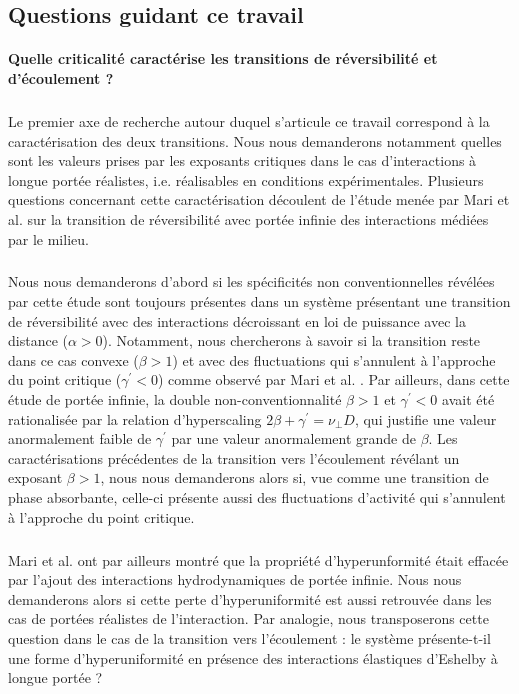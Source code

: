 \subsection{Questions guidant ce travail}

\paragraph{Quelle criticalité caractérise les transitions de réversibilité et d'écoulement ?}

\subparagraph{}Le premier axe de recherche autour duquel s'articule ce travail correspond à la caractérisation des deux transitions. Nous nous demanderons notamment quelles sont les valeurs prises par les exposants critiques dans le cas d'interactions à longue portée réalistes, i.e. réalisables en conditions expérimentales. Plusieurs questions concernant cette caractérisation découlent de l'étude menée par Mari et al. \cite{mari_absorbing_2022} sur la transition de réversibilité avec portée infinie des interactions médiées par le milieu. 

\subparagraph{}Nous nous demanderons d'abord si les spécificités non conventionnelles révélées par cette étude sont toujours présentes dans un système présentant une transition de réversibilité avec des interactions décroissant en loi de puissance avec la distance ($\alpha > 0$). Notamment, nous chercherons à savoir si la transition reste dans ce cas convexe ($\beta >1$) et avec des fluctuations qui s'annulent à l'approche du point critique ($\gamma^\prime < 0$) comme observé par Mari et al. \cite{mari_absorbing_2022}. Par ailleurs, dans cette étude de portée infinie, la double non-conventionnalité $\beta >1$ et $\gamma^\prime < 0$ avait été rationalisée par la relation d'hyperscaling $2\beta + \gamma^\prime = \nu_\perp D$, qui justifie une valeur anormalement faible de $\gamma^\prime$ par une valeur anormalement grande de $\beta$. Les caractérisations précédentes de la transition vers l'écoulement révélant un exposant $\beta >1$, nous nous demanderons alors si, vue comme une transition de phase absorbante, celle-ci présente aussi des fluctuations d'activité qui s'annulent à l'approche du point critique.

\subparagraph{}Mari et al. ont par ailleurs montré que la propriété d'hyperunformité était effacée par l'ajout des interactions hydrodynamiques de portée infinie. Nous nous demanderons alors si cette perte d'hyperuniformité est aussi retrouvée dans les cas de portées réalistes de l'interaction. Par analogie, nous transposerons cette question dans le cas de la transition vers l'écoulement : le système présente-t-il une forme d'hyperuniformité en présence des interactions élastiques d'Eshelby à longue portée ?

